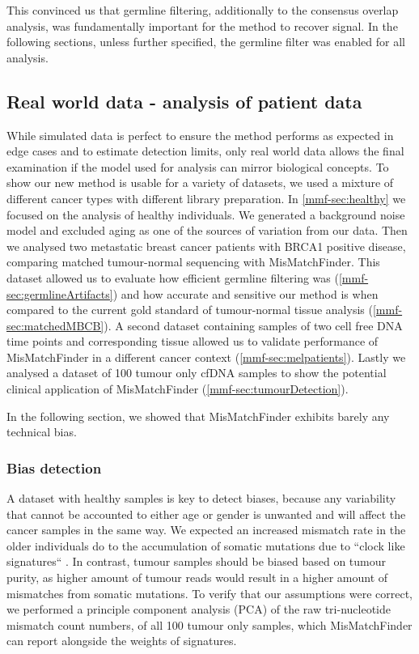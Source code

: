 This convinced us that germline filtering, additionally to the consensus overlap analysis, was fundamentally important for the method to recover signal. In the following sections, unless further specified, the germline filter was enabled for all analysis.


\subsection{Real world data - analysis of patient data}
\label{mmf-sec:realworld}

While simulated data is perfect to ensure the method performs as expected in edge cases and to estimate detection limits, only real world data allows the final examination if the model used for analysis can mirror biological concepts. To show our new method is usable for a variety of datasets, we used a mixture of different cancer types with different library preparation. In \autoref{mmf-sec:healthy} we focused on the analysis of healthy individuals. We generated a background noise model and excluded aging as one of the sources of variation from our data. Then we analysed two metastatic breast cancer patients with BRCA1 positive disease, comparing matched tumour-normal sequencing with MisMatchFinder. This dataset allowed us to evaluate how efficient germline filtering was (\autoref{mmf-sec:germlineArtifacts}) and how accurate and sensitive our method is when compared to the current gold standard of tumour-normal tissue analysis (\autoref{mmf-sec:matchedMBCB}).
A second dataset containing samples of two cell free DNA time points and corresponding tissue allowed us to validate performance of MisMatchFinder in a different cancer context (\autoref{mmf-sec:melpatients}). Lastly we analysed a dataset of 100 tumour only cfDNA samples to show the potential clinical application of MisMatchFinder (\autoref{mmf-sec:tumourDetection}).

In the following section, we showed that MisMatchFinder exhibits barely any technical bias.

\subsubsection{Bias detection}
\label{mmf-sec:healthyBias}
A dataset with healthy samples is key to detect biases, because any variability that cannot be accounted to either age or gender is unwanted and will affect the cancer samples in the same way. We expected an increased mismatch rate in the older individuals do to the accumulation of somatic mutations due to ``clock like signatures`` \cite{Abascal2021}. In contrast, tumour samples should be biased based on tumour purity, as higher amount of tumour reads would result in a higher amount of mismatches from somatic mutations.
To verify that our assumptions were correct, we performed a principle component analysis (PCA) of the raw tri-nucleotide mismatch count numbers, of all 100 tumour only samples, which MisMatchFinder can report alongside the weights of signatures.

